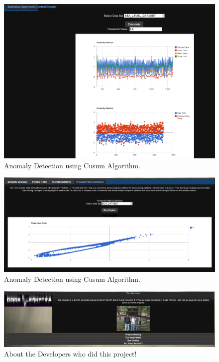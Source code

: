 \documentclass[12pt]{report}
\begin{document}
\begin{figure}[h!]
  
  \centering
    \includegraphics[scale=0.350]{./screenshots/ano_stat_app_2.png}
\caption{Anomaly Detection using Cusum Algorithm.}
\end{figure}

\begin{figure}[h!]
  
  \centering
    \includegraphics[scale=0.350]{./screenshots/temp_pattern.png}
\caption{Anomaly Detection using Cusum Algorithm.}
\end{figure}
\begin{figure}[h!]
  
  \centering
    \includegraphics[scale=0.35]{./screenshots/about_us.png}
\caption{About the Developers who did this project!}
\end{figure}
\end{document}
